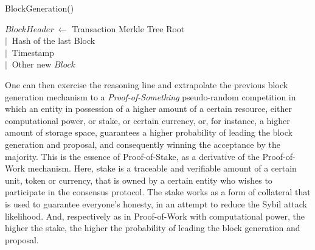 \begin{procedure} [!h]
	\caption{BlockGeneration()} \label{proc:BlockGeneration}
	\BlankLine
  $BlockHeader \ \gets$ Transaction Merkle Tree Root
  \\ \qquad $| \ $ Hash of the last Block
  \\ \qquad $| \ $ Timestamp
  \\ \qquad $| \ $ Other\;
  \BlankLine
  \Return new $Block$\;
\end{procedure}

One can then exercise the reasoning line and extrapolate the previous block generation mechanism to a \emph{Proof-of-Something} pseudo-random competition in which an entity in possession of a higher amount of a certain resource, either computational power, or stake, or certain currency, or, for instance, a higher amount of storage space, guarantees a higher probability of leading the block generation and proposal, and consequently winning the acceptance by the majority. This is the essence of Proof-of-Stake, as a derivative of the Proof-of-Work mechanism. Here, stake is a traceable and verifiable amount of a certain unit, token or currency, that is owned by a certain entity who wishes to participate in the consensus protocol. The stake works as a form of collateral that is used to guarantee everyone's honesty, in an attempt to reduce the Sybil attack likelihood. And, respectively as in Proof-of-Work with computational power, the higher the stake, the higher the probability of leading the block generation and proposal.

